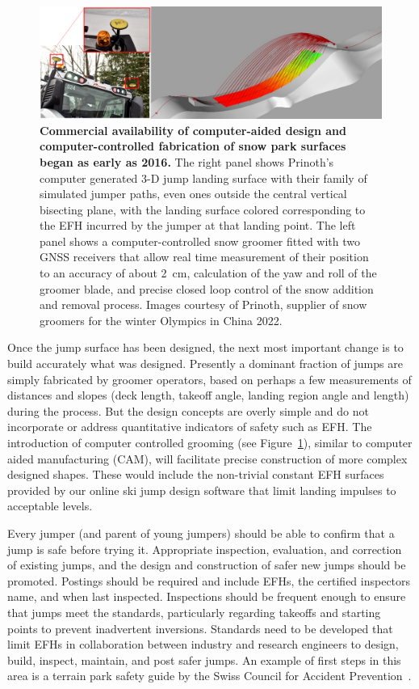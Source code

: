 \documentclass{article}
\begin{document}
\begin{figure}
  \centering
  \includegraphics[width=\columnwidth]{figures/prinoth.png}
  \caption{\textbf{Commercial availability of computer-aided design and
    computer-controlled fabrication of snow park surfaces began as early as
    2016.} The right panel shows Prinoth's computer generated 3-D jump landing
    surface with their family of simulated jumper paths, even ones outside the
    central vertical bisecting plane, with the landing surface colored
    corresponding to the EFH incurred by the jumper at that landing point. The
    left panel shows a computer-controlled snow groomer fitted with two GNSS
    receivers that allow real time measurement of their position to an accuracy
    of about 2~\si{\centi\meter}, calculation of the yaw and roll of the
    groomer blade, and precise closed loop control of the snow addition and
    removal process.  Images courtesy of Prinoth, supplier of snow groomers for
  the winter Olympics in China 2022.}
  \label{fig:prinoth}
\end{figure}

Once the jump surface has been designed, the next most important change is to
build accurately what was designed. Presently a dominant fraction of jumps are
simply fabricated by groomer operators, based on perhaps a few measurements of
distances and slopes (deck length, takeoff angle, landing region angle and
length) during the process. But the design concepts are overly simple and do
not incorporate or address quantitative indicators of safety such as EFH. The
introduction of computer controlled grooming (see Figure~\ref{fig:prinoth}),
similar to computer aided manufacturing (CAM), will facilitate precise
construction of more complex designed shapes. These would include the
non-trivial constant EFH surfaces provided by our online ski jump design
software that limit landing impulses to acceptable levels.

Every jumper (and parent of young jumpers) should be able to confirm that a
jump is safe before trying it. Appropriate inspection, evaluation, and
correction of existing jumps, and the design and construction of safer new
jumps should be promoted.  Postings should be required and include EFHs, the
certified inspectors name, and when last inspected.  Inspections should be
frequent enough to ensure that jumps meet the standards, particularly regarding
takeoffs and starting points to prevent inadvertent inversions. Standards need
to be developed that limit EFHs in collaboration between industry and research
engineers to design, build, inspect, maintain, and post safer jumps. An example
of first steps in this area is a terrain park safety guide by the Swiss Council
for Accident Prevention~\cite{Heer2019}.
\end{document}
